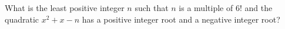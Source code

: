 What is the least positive integer $n$ such that $n$ is a multiple of $6!$ and the quadratic $x^2+x-n$ has a positive integer root and a negative integer root?
